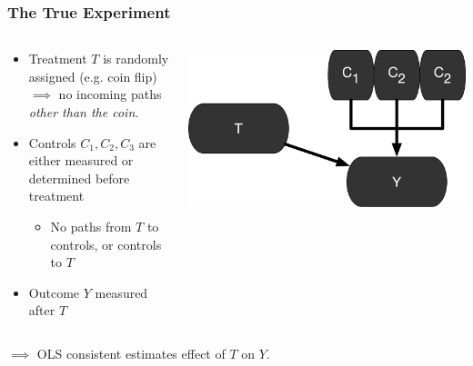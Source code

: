 \documentclass[12pt, block=fill]{beamer}
\begin{document}
\begin{frame}
  \frametitle{The True Experiment}
  

  \begin{columns}
    \begin{column}{0.6\textwidth}
      \begin{itemize} 
      \item Treatment $T$ is randomly assigned (e.g. coin flip)
        $\implies$  no incoming paths \textit{other than the coin}.
      \item Controls $C_1, C_2, C_3$ are either measured or determined before
        treatment
        \begin{itemize}
        \item No paths from $T$ to controls, or controls to $T$
        \end{itemize}
      \item Outcome $Y$ measured after $T$
      \end{itemize} 
    \end{column}
    
    \begin{column}{0.4\textwidth} 
      \includegraphics[width = \textwidth]{images/experiment.png}
      
    \end{column}
  \end{columns}
  
  \vspace{.5cm}
  $\implies$ OLS consistent estimates effect of $T$ on $Y$.
\end{frame}
\end{document}
